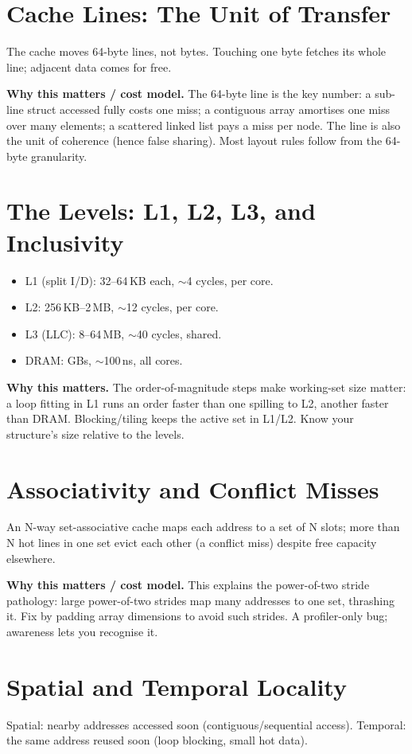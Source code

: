 \section{Cache Lines: The Unit of Transfer}
The cache moves 64-byte lines, not bytes. Touching one byte fetches its whole line; adjacent data comes for free.

\textbf{Why this matters / cost model.} The 64-byte line is the key number: a sub-line struct accessed fully costs one miss; a contiguous array amortises one miss over many elements; a scattered linked list pays a miss per node. The line is also the unit of coherence (hence false sharing). Most layout rules follow from the 64-byte granularity.

\section{The Levels: L1, L2, L3, and Inclusivity}
\begin{itemize}
\item L1 (split I/D): 32--64\,KB each, $\sim$4 cycles, per core.
\item L2: 256\,KB--2\,MB, $\sim$12 cycles, per core.
\item L3 (LLC): 8--64\,MB, $\sim$40 cycles, shared.
\item DRAM: GBs, $\sim$100\,ns, all cores.
\end{itemize}

\textbf{Why this matters.} The order-of-magnitude steps make working-set size matter: a loop fitting in L1 runs an order faster than one spilling to L2, another faster than DRAM. Blocking/tiling keeps the active set in L1/L2. Know your structure's size relative to the levels.

\section{Associativity and Conflict Misses}
An N-way set-associative cache maps each address to a set of N slots; more than N hot lines in one set evict each other (a conflict miss) despite free capacity elsewhere.

\textbf{Why this matters / cost model.} This explains the power-of-two stride pathology: large power-of-two strides map many addresses to one set, thrashing it. Fix by padding array dimensions to avoid such strides. A profiler-only bug; awareness lets you recognise it.

\section{Spatial and Temporal Locality}
Spatial: nearby addresses accessed soon (contiguous/sequential access). Temporal: the same address reused soon (loop blocking, small hot data).

